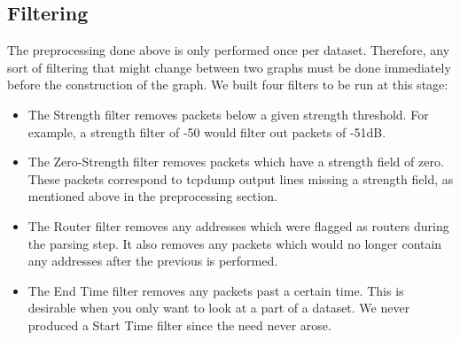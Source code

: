 \documentclass[letterpaper,abstract=on,titlepage=false]{scrreprt}
\begin{document}
	\subsection*{Filtering}
    The preprocessing done above is only performed once per dataset.
    Therefore, any sort of filtering that might change between two graphs must be done immediately before the construction of the graph.
    We built four filters to be run at this stage:
    \begin{itemize}
    \item The Strength filter removes packets below a given strength threshold.
      For example, a strength filter of -50 would filter out packets of -51dB.
    \item The Zero-Strength filter removes packets which have a strength field of zero.
      These packets correspond to tcpdump output lines missing a strength field, as mentioned above in the preprocessing section.
    \item The Router filter removes any addresses which were flagged as routers during the parsing step.
      It also removes any packets which would no longer contain any addresses after the previous is performed.
    \item The End Time filter removes any packets past a certain time.
      This is desirable when you only want to look at a part of a dataset.
      We never produced a Start Time filter since the need never arose.
    \end{itemize}
\end{document}
